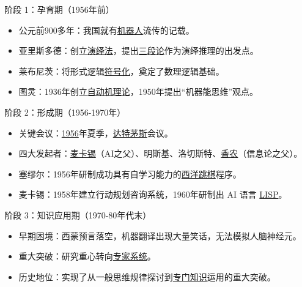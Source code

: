 \documentclass[11pt,a4paper]{ctexrep}
\newcommand{\fillblank}[1]{\underline{\hspace{2em}#1\hspace{2em}}}
\begin{document}
\begin{qbox}{阶段 1：孕育期（1956年前）}
    \begin{itemize}
        \item 公元前900多年：我国就有\fillblank{机器人}流传的记载。
        \item 亚里斯多德：创立\fillblank{演绎法}，提出\fillblank{三段论}作为演绎推理的出发点。
        \item 莱布尼茨：将形式逻辑\fillblank{符号化}，奠定了数理逻辑基础。
        \item 图灵：1936年创立\fillblank{自动机理论}，1950年提出“机器能思维”观点。
    \end{itemize}
\end{qbox}

\begin{qbox}{阶段 2：形成期（1956-1970年）}
    \begin{itemize}
        \item 关键会议：\fillblank{1956}年夏季，\fillblank{达特茅斯}会议。
        \item 四大发起者：\fillblank{麦卡锡}（AI之父）、明斯基、洛切斯特、\fillblank{香农}（信息论之父）。
        \item 塞缪尔：1956年研制成功具有自学习能力的\fillblank{西洋跳棋}程序。
        \item 麦卡锡：1958年建立行动规划咨询系统，1960年研制出 AI 语言 \fillblank{LISP}。
    \end{itemize}
\end{qbox}

\begin{qbox}{阶段 3：知识应用期（1970-80年代末）}
    \begin{itemize}
        \item 早期困境：西蒙预言落空，机器翻译出现大量笑话，无法模拟人脑神经元。
        \item 重大突破：研究重心转向\fillblank{专家系统}。
        \item 历史地位：实现了从一般思维规律探讨到\fillblank{专门知识}运用的重大突破。
    \end{itemize}
\end{qbox}
\end{document}
